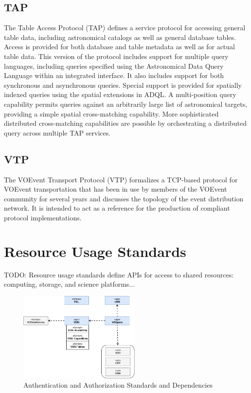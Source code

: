 \documentclass[11pt,a4paper]{ivoa}
\begin{document}
\subsection{TAP}
\label{dal:tap}

The Table Access Protocol (TAP) \citep{2019ivoa.spec.0927D} defines a service protocol for accessing general table data, 
including astronomical catalogs as well as general database tables. Access is provided 
for both database and table metadata as well as for actual table data. This version of 
the protocol includes support for multiple query languages, including queries specified 
using the Astronomical Data Query Language within an integrated interface. It also 
includes support for both synchronous and asynchronous queries. Special support is 
provided for spatially indexed queries using the spatial extensions in ADQL. A multi-position 
query capability permits queries against an arbitrarily large list of astronomical targets, 
providing a simple spatial cross-matching capability. More sophisticated distributed 
cross-matching capabilities are possible by orchestrating a distributed query across 
multiple TAP services. 

\subsection{VTP}

The VOEvent Transport Protocol (VTP) \citep{2017ivoa.spec.0320S} formalizes a TCP-based protocol for VOEvent transportation 
that has been in use by members of the VOEvent community for several years and discusses 
the topology of the event distribution network. It is intended to act as a reference for 
the production of compliant protocol implementations. 

\section{Resource Usage Standards}

TODO: Resource usage standards define APIs for access to shared resources: computing, storage, 
and science platforms...

\begin{figure}[h]
\centering
\includegraphics[width=0.54\textwidth]{ivoa-arch-gws.pdf}
\caption{Authentication and Authorization Standards and Dependencies}
\label{fig:gwsdeps}
\end{figure}
\end{document}
